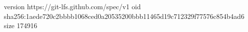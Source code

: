 version https://git-lfs.github.com/spec/v1
oid sha256:1aede720c2bbbb1068ced0a20535200bbb11465d19c712329f77576c854b4ad6
size 174916
